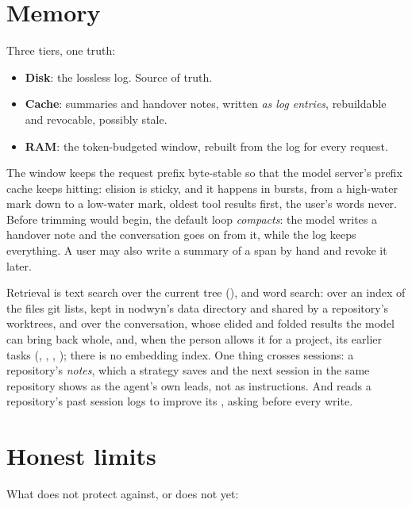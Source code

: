 \chapter{Memory}

Three tiers, one truth:

\begin{itemize}
\item \textbf{Disk}: the lossless log. Source of truth.
\item \textbf{Cache}: summaries and handover notes, written \emph{as log
  entries}, rebuildable and revocable, possibly stale.
\item \textbf{RAM}: the token-budgeted window, rebuilt from the log for every
  request.
\end{itemize}

The window keeps the request prefix byte-stable so that the model server's
prefix cache keeps hitting: elision is sticky, and it happens in bursts,
from a high-water mark down to a low-water mark, oldest tool results first,
the user's words never. Before trimming would begin, the default loop
\emph{compacts}: the model writes a handover note and the conversation goes
on from it, while the log keeps everything. A user may also write a summary
of a span by hand and revoke it later.

Retrieval is text search over the current tree (), and
word search: over an index of the files git lists, kept in nodwyn's data
directory and shared by a repository's worktrees, and over the
conversation, whose elided and folded results the model can bring back
whole, and, when the person allows it for a project, its earlier tasks
(, , , );
there is no embedding index. One thing crosses sessions: a repository's
\emph{notes}, which a strategy saves and the next session in the same
repository shows as the agent's own leads, not as instructions. And
 reads a repository's past session logs to improve its
, asking before every write.

\chapter{Honest limits}\label{ch:limits}

What \nodwyn{} does not protect against, or does not yet:

